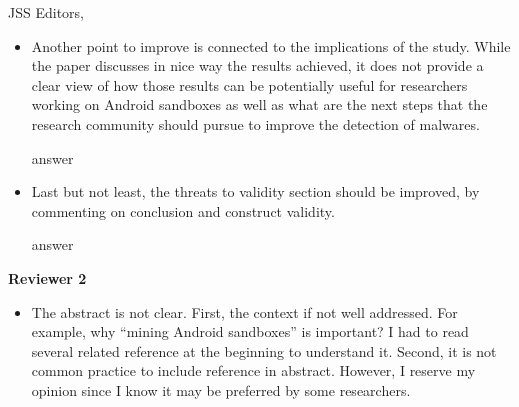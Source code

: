\documentclass{letter}
\begin{document}
\begin{letter}{JSS Editors,}
\begin{itemize}
\vspace{0.2cm}

{\color{blue}{\bf Answer:} Thanks for this comment. Our tool actually is available at gitHub repository at:

https://github.com/droidxp/benchmark.
 \vspace{0.2cm}

We also provide data and scripts of our experiments on-line at:

https://htmlpreview.github.io/?https://github.com/droidxp/paper-replication-package/blob/master/replication.html. 
\vspace{0.2cm}\newline
At Section 1 (Introduction) we highlight the existence of these 2 repositories that can be useful for other researchers interested in our study.}

\vspace{0.2cm}

\item Another point to improve is connected to the implications of the study. While the paper discusses in nice way the 
results achieved, it does not provide a clear view of how those results can be potentially useful for researchers 
working on Android sandboxes as well as what are the next steps that the research community should pursue to 
improve the detection of malwares.


\vspace{0.2cm}

{\color{blue}{\bf Answer:} answer}

\vspace{0.2cm}

\item Last but not least, the threats to validity section should be improved, by commenting on conclusion and construct validity.


\vspace{0.2cm}

{\color{blue}{\bf Answer:} answer}


\end{itemize}

{\bf Reviewer 2}

\begin{itemize}

\item The abstract is not clear. First, the context if not well addressed. For example, why ``mining Android sandboxes'' is 
important? I had to read several related reference at the beginning to understand it. Second, it is not common practice to 
include reference in abstract. However, I reserve my opinion since I know it may be preferred by some researchers.



\end{itemize}
\end{letter}
\end{document}
